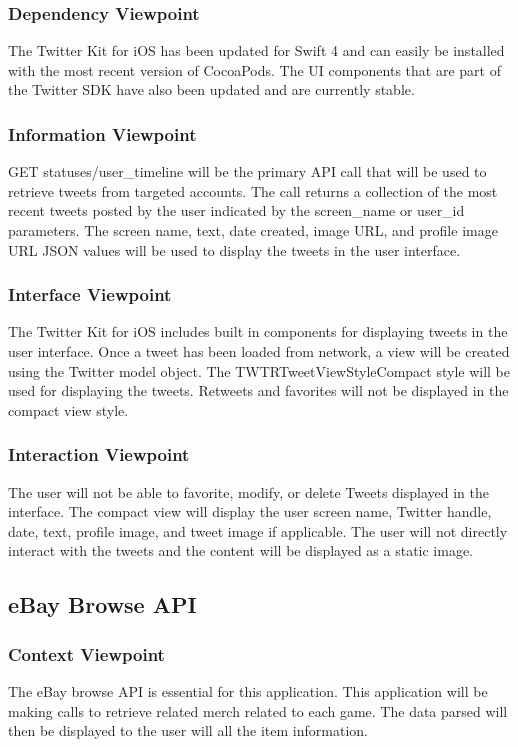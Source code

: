 \documentclass[onecolumn, draftclsnofoot,10pt, compsoc]{IEEEtran}
\begin{document}
\subsubsection{Dependency Viewpoint}
The Twitter Kit for iOS has been updated for Swift 4 and can easily be installed with the most recent version of CocoaPods. 
The UI components that are part of the Twitter SDK have also been updated and are currently stable. 
\subsubsection{Information Viewpoint}
GET statuses/user\_timeline will be the primary API call that will be used to retrieve tweets from targeted accounts. 
The call returns a collection of the most recent tweets posted by the user indicated by the screen\_name or user\_id parameters. 
The screen name, text, date created, image URL, and profile image URL JSON values will be used to display the tweets in the user interface. 
\subsubsection{Interface Viewpoint}
The Twitter Kit for iOS includes built in components for displaying tweets in the user interface. 
Once a tweet has been loaded from network, a view will be created using the Twitter model object.
The TWTRTweetViewStyleCompact style will be used for displaying the tweets.
Retweets and favorites will not be displayed in the compact view style. 
\subsubsection{Interaction Viewpoint}
The user will not be able to favorite, modify, or delete Tweets displayed in the interface.
The compact view will display the user screen name, Twitter handle, date, text, profile image, and tweet image if applicable. The user will not directly interact with the tweets and the content will be displayed as a static image. 

\subsection{eBay Browse API}
\subsubsection{Context Viewpoint}
The eBay browse API is essential for this application. This application will be making calls to retrieve related merch related to each game. The data parsed will then be displayed to the user will all the item information. 
\end{document}
